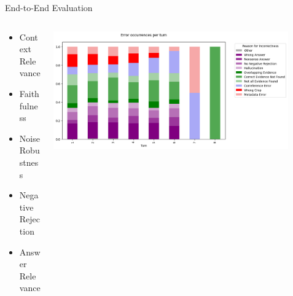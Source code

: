 \documentclass{beamer}
\begin{document}
\begin{frame}{End-to-End Evaluation}

  \begin{columns}[T]
    \begin{column}{.5\textwidth}
      \begin{itemize}
        \item \alert<1>{Context Relevance}
        \item Faithfulness
        \item Noise Robustness
        \item Negative Rejection
        \item Answer Relevance
      \end{itemize}
    \end{column}

    \begin{column}{.5\textwidth}
      \centering

      \includegraphics[width=0.9\textwidth]{Grafiken/Turns-Errors.png}
   \end{column}

  \end{columns}

\end{frame}
\end{document}
